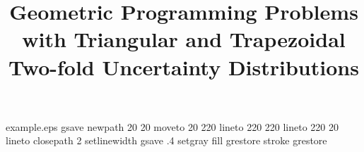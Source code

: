 %
%
%
%
%
\begin{filecontents*}{example.eps}
gsave
newpath
  20 20 moveto
  20 220 lineto
  220 220 lineto
  220 20 lineto
closepath
2 setlinewidth
gsave
  .4 setgray fill
grestore
stroke
grestore
\end{filecontents*}
%
\RequirePackage{fix-cm}
%
\documentclass[smallextended]{svjour3}       %
%
\smartqed  %
%
\usepackage{graphicx}
\usepackage{etex,bm}
\usepackage{amsmath,amssymb,mathrsfs,mathtools}
\usepackage{amsfonts}
\usepackage{cite}
\usepackage[colorlinks=true,citecolor=blue,linkcolor=blue]{hyperref}
\usepackage[margin=1in]{geometry}
\usepackage{multirow,booktabs}
\usepackage{empheq}
\usepackage{array}
\usepackage{caption}
\usepackage{subcaption}
\usepackage{relsize}
\renewcommand{\figurename}{Figure}
\newcommand\norm[1]{\lVert#1\rVert}
\renewenvironment{proof}{\paragraph{Proof:}}{\hfill$\square$}
\usepackage[utf8]{inputenc}
%
%
%
%
%


\title{Geometric Programming Problems with Triangular and Trapezoidal Two-fold Uncertainty Distributions %
}

